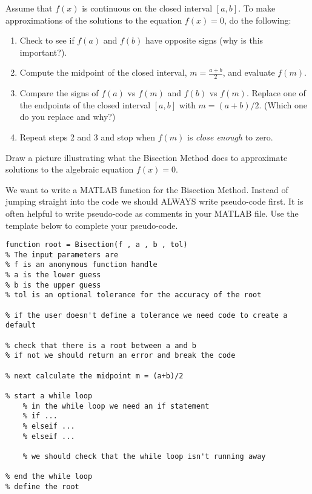 \begin{algorithm}
    Assume that $f(x)$ is continuous on the closed interval $[a,b]$. To make approximations of
    the solutions to the equation $f(x) = 0$, do the following:
    \begin{enumerate}
        \item Check to see if $f(a)$ and $f(b)$ have opposite signs
            (why is this important?).
        \item Compute the midpoint of the closed interval, $m=\frac{a+b}{2}$, and evaluate $f(m)$.
        \item Compare the signs of $f(a)$ vs $f(m)$ and $f(b)$ vs $f(m)$.  Replace one of
            the endpoints of the closed interval $[a,b]$ with $m=(a+b)/2$. (Which one do
            you replace and why?)
        \item Repeat steps 2 and 3 and stop when $f(m)$ is {\it close enough} to zero.
    \end{enumerate}
\end{algorithm}

\begin{problem}
    Draw a picture illustrating what the Bisection Method does to approximate solutions to
    the algebraic equation $f(x) = 0$.
\end{problem}


\begin{problem}
    We want to write a MATLAB function for the Bisection Method.  Instead of jumping
    straight into the code we should ALWAYS write pseudo-code first.  It is often helpful
    to write pseudo-code as comments in your MATLAB file.  Use the template below to
    complete your pseudo-code.
\begin{lstlisting}
function root = Bisection(f , a , b , tol)
% The input parameters are
% f is an anonymous function handle
% a is the lower guess
% b is the upper guess
% tol is an optional tolerance for the accuracy of the root

% if the user doesn't define a tolerance we need code to create a default

% check that there is a root between a and b
% if not we should return an error and break the code

% next calculate the midpoint m = (a+b)/2

% start a while loop
    % in the while loop we need an if statement
    % if ...
    % elseif ...
    % elseif ...

    % we should check that the while loop isn't running away

% end the while loop
% define the root
\end{lstlisting}
\end{problem}


